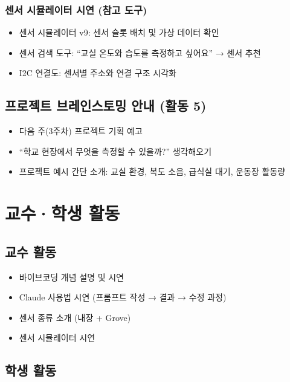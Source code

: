 \documentclass[11pt, a4paper]{article}
\begin{document}
\subsubsection{센서 시뮬레이터 시연 (참고 도구)}

\begin{itemize}[leftmargin=1.5em]
\item 센서 시뮬레이터 v9: 센서 슬롯 배치 및 가상 데이터 확인
\item 센서 검색 도구: ``교실 온도와 습도를 측정하고 싶어요'' → 센서 추천
\item I2C 연결도: 센서별 주소와 연결 구조 시각화
\end{itemize}

\subsection{프로젝트 브레인스토밍 안내 (활동 5)}

\begin{itemize}[leftmargin=1.5em]
\item 다음 주(3주차) 프로젝트 기획 예고
\item ``학교 현장에서 무엇을 측정할 수 있을까?'' 생각해오기
\item 프로젝트 예시 간단 소개: 교실 환경, 복도 소음, 급식실 대기, 운동장 활동량
\end{itemize}

\section{교수·학생 활동}

\subsection{교수 활동}

\begin{itemize}[leftmargin=1.5em]
\item 바이브코딩 개념 설명 및 시연
\item Claude 사용법 시연 (프롬프트 작성 → 결과 → 수정 과정)
\item 센서 종류 소개 (내장 + Grove)
\item 센서 시뮬레이터 시연
\end{itemize}

\subsection{학생 활동}
\end{document}

